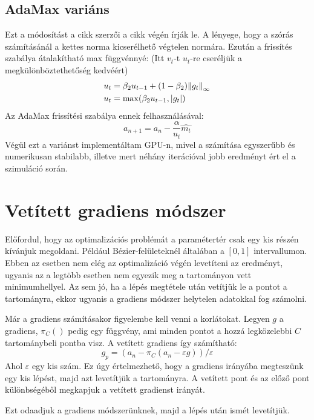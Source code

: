 \subsection{AdaMax variáns}
Ezt a módosítást a cikk \cite{Adam} szerzői a cikk végén írják le. A lényege, hogy a szórás számításánál a kettes norma kicserélhető végtelen normára. Ezután a frissítés szabálya átalakítható max függvénnyé: (Itt $v_t$-t $u_t$-re cseréljük a megkülönböztethetőség kedvéért)
\begin{align*} 
	u_t &= \beta_2 u_{t-1} + (1-\beta_2)\norm{g_t}_\infty \\ 
	u_t &= \max (\beta_2 u_{t-1}, |g_t|)
\end{align*}
Az AdaMax frissítési szabálya ennek felhasználásával:
$$ a_{n+1} = a_n - \frac{\alpha}{u_t}\hat{m_t} $$
Végül ezt a variánst implementáltam GPU-n, mivel a számítása egyszerűbb és numerikusan stabilabb, illetve mert néhány iterációval jobb eredményt ért el a szimuláció során. 


\section{Vetített gradiens módszer}

Előfordul, hogy az optimalizációs problémát a paramétertér csak egy kis részén kívánjuk megoldani. Például Bézier-felületeknél általában a $[0,1]$ intervallumon. Ebben az esetben nem elég az optimalizáció végén levetíteni az eredményt, ugyanis az a legtöbb esetben nem egyezik meg a tartományon vett minimumhellyel. \cite{MirrorDescent} Az sem jó, ha a lépés megtétele után vetítjük le a pontot a tartományra, ekkor ugyanis a gradiens módszer helytelen adatokkal fog számolni. 

Már a gradiens számításakor figyelembe kell venni a korlátokat. Legyen $g$ a gradiens, $\pi_C()$ pedig egy függvény, ami minden pontot a hozzá legközelebbi $C$ tartománybeli pontba visz. A vetített gradiens így számítható:
$$ g_p = (a_n - \pi_C(a_n-\varepsilon g))/\varepsilon $$
Ahol $\varepsilon$ egy kis szám. Ez úgy értelmezhető, hogy a gradiens irányába megteszünk egy kis lépést, majd azt levetítjük a tartományra. A vetített pont és az előző pont különbségéből megkapjuk a vetített gradienst irányát.

Ezt odaadjuk a gradiens módszerünknek, majd a lépés után ismét levetítjük. 




